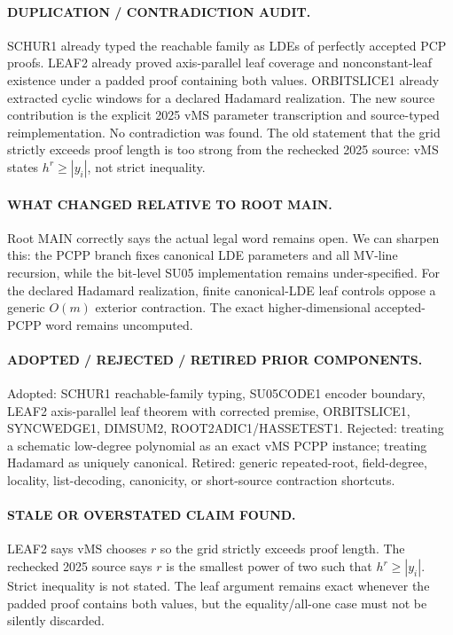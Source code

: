 \documentclass[11pt]{article}
\begin{document}
\paragraph{DUPLICATION / CONTRADICTION AUDIT.}
SCHUR1 already typed the reachable family as LDEs of perfectly accepted PCP proofs. LEAF2 already proved axis-parallel leaf coverage and nonconstant-leaf existence under a padded proof containing both values. ORBITSLICE1 already extracted cyclic windows for a declared Hadamard realization. The new source contribution is the explicit 2025 vMS parameter transcription and source-typed reimplementation. No contradiction was found. The old statement that the grid strictly exceeds proof length is too strong from the rechecked 2025 source: vMS states $h^r\ge |y_i|$, not strict inequality.

\paragraph{WHAT CHANGED RELATIVE TO ROOT MAIN.}
Root MAIN correctly says the actual legal word remains open. We can sharpen this: the PCPP branch fixes canonical LDE parameters and all MV-line recursion, while the bit-level SU05 implementation remains under-specified. For the declared Hadamard realization, finite canonical-LDE leaf controls oppose a generic $O(m)$ exterior contraction. The exact higher-dimensional accepted-PCPP word remains uncomputed.

\paragraph{ADOPTED / REJECTED / RETIRED PRIOR COMPONENTS.}
Adopted: SCHUR1 reachable-family typing, SU05CODE1 encoder boundary, LEAF2 axis-parallel leaf theorem with corrected premise, ORBITSLICE1, SYNCWEDGE1, DIMSUM2, ROOT2ADIC1/HASSETEST1.
Rejected: treating a schematic low-degree polynomial as an exact vMS PCPP instance; treating Hadamard as uniquely canonical.
Retired: generic repeated-root, field-degree, locality, list-decoding, canonicity, or short-source contraction shortcuts.

\paragraph{STALE OR OVERSTATED CLAIM FOUND.}
LEAF2 says vMS chooses $r$ so the grid strictly exceeds proof length. The rechecked 2025 source says $r$ is the smallest power of two such that $h^r\ge |y_i|$. Strict inequality is not stated. The leaf argument remains exact whenever the padded proof contains both values, but the equality/all-one case must not be silently discarded.
\end{document}
